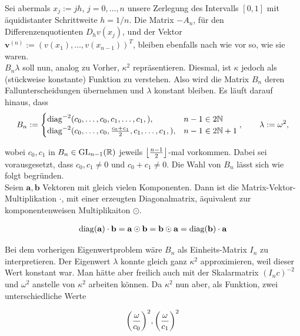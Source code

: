Sei abermals $x_j := jh$, $j = 0, \ldots, n$ unsere Zerlegung des Intervalls $[0, 1]$ mit äquidistanter Schrittweite $h = 1/n$. Die Matrix $-A_n$, für den Differenzenquotienten $D_h v(x_j)$, und der Vektor $\mathbf{v}^{(n)} := (v(x_1), \ldots, v(x_{n-1}))^T$, bleiben ebenfalls nach wie vor so, wie sie waren. \\

$B_n \lambda$ soll nun, analog zu Vorher, $\kappa^2$ repräsentieren. Diesmal, ist $\kappa$ jedoch als (stückweise konstante) Funktion zu verstehen. Also wird die Matrix $B_n$ deren Fallunterscheidungen übernehmen und $\lambda$ konstant bleiben. Es läuft darauf hinaus, dass \\

\begin{align*}
  B_n :=
  \begin{cases}
    \diag^{-2}
    (
      c_0, \ldots, c_0,
      c_1, \ldots, c_1,
    ), & n-1 \in 2 \N \\
    \diag^{-2}
    (
      c_0, \ldots, c_0,
      \frac{c_0 + c_1}{2},
      c_1, \ldots, c_1,
    ), & n-1 \in 2 \N + 1
  \end{cases},
  \qquad
  \lambda := \omega^2,
\end{align*}

wobei $c_0, c_1$ in $B_n \in \GL[n-1]{\R}$ jeweils $\floor{\frac{n-1}{2}}$-mal vorkommen. Dabei sei vorausgesetzt, dass $c_0, c_1 \neq 0$ und $c_0 + c_1 \neq 0$. Die Wahl von $B_n$ lässt sich wie folgt begründen. \\

Seien $\mathbf{a}, \mathbf{b}$ Vektoren mit gleich vielen Komponenten. Dann ist die Matrix-Vektor-Multiplikation $\cdot$, mit einer erzeugten Diagonalmatrix, äquivalent zur komponentenweisen Multiplikaiton $\odot$.

\begin{align} \label{Diagonalmatrizen}
  \diag(\mathbf{a}) \cdot \mathbf{b} =
  \mathbf{a} \odot \mathbf{b} =
  \mathbf{b} \odot \mathbf{a} =
  \diag(\mathbf{b}) \cdot \mathbf{a}
\end{align}

Bei dem vorherigen Eigenwertproblem wäre $B_n$ als Einheits-Matrix $I_n$ zu interpretieren. Der Eigenwert $\lambda$ konnte gleich ganz $\kappa^2$ approximieren, weil dieser Wert konstant war. Man hätte aber freilich auch mit der Skalarmatrix $(I_n c)^{-2}$ und $\omega^2$ anstelle von $\kappa^2$ arbeiten können. Da $\kappa^2$ nun aber, als Funktion, zwei unterschiedliche Werte

\begin{align*}
  \pbraces{\frac{\omega}{c_0}}^2,
  \pbraces{\frac{\omega}{c_1}}^2
\end{align*}

